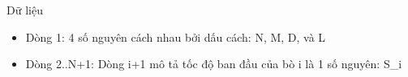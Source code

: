 Dữ liệu
\begin{itemize}
	\item     Dòng 1: 4 số nguyên cách nhau bởi dấu cách: N, M, D, và L   
	\item     Dòng 2..N+1: Dòng i+1 mô tả tốc độ ban đầu của bò i là 1 số nguyên: S\_i   
\end{itemize}